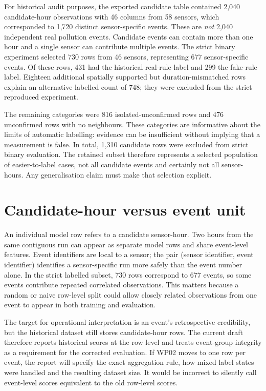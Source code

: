 \documentclass[12pt,a4paper,oneside]{report}
\begin{document}
For historical audit purposes, the exported candidate table contained 2,040 candidate-hour observations with 46 columns from 58 sensors, which corresponded to 1,720 distinct sensor-specific events. These are \emph{not} 2,040 independent real pollution events. Candidate events can contain more than one hour and a single sensor can contribute multiple events. The strict binary experiment selected 730 rows from 46 sensors, representing 677 sensor-specific events. Of these rows, 431 had the historical real-rule label and 299 the fake-rule label. Eighteen additional spatially supported but duration-mismatched rows explain an alternative labelled count of 748; they were excluded from the strict reproduced experiment.

The remaining categories were 816 isolated-unconfirmed rows and 476 unconfirmed rows with no neighbours. These categories are informative about the limits of automatic labelling: evidence can be insufficient without implying that a measurement is false. In total, 1,310 candidate rows were excluded from strict binary evaluation. The retained subset therefore represents a selected population of easier-to-label cases, not all candidate events and certainly not all sensor-hours. Any generalisation claim must make that selection explicit.

\section{Candidate-hour versus event unit}
An individual model row refers to a candidate sensor-hour. Two hours from the same contiguous run can appear as separate model rows and share event-level features. Event identifiers are local to a sensor; the pair (sensor identifier, event identifier) identifies a sensor-specific run more safely than the event number alone. In the strict labelled subset, 730 rows correspond to 677 events, so some events contribute repeated correlated observations. This matters because a random or naive row-level split could allow closely related observations from one event to appear in both training and evaluation.

The target for operational interpretation is an event's retrospective credibility, but the historical dataset still stores candidate-hour rows. The current draft therefore reports historical scores at the row level and treats event-group integrity as a requirement for the corrected evaluation. If WP02 moves to one row per event, the report will specify the exact aggregation rule, how mixed label states were handled and the resulting dataset size. It would be incorrect to silently call event-level scores equivalent to the old row-level scores.
\end{document}

